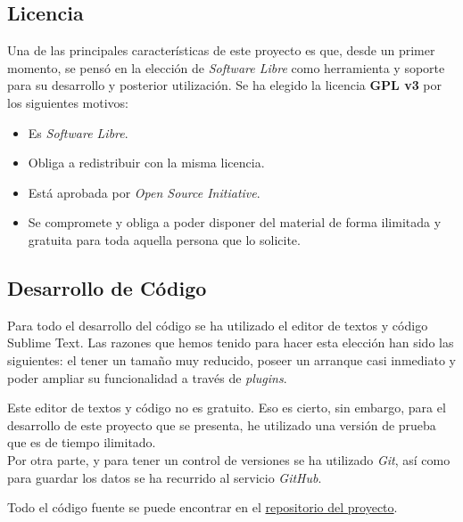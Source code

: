 \subsection{Licencia}
Una de las principales características de este proyecto es que, desde un primer momento, se pensó en la elección de \textit{Software Libre} como herramienta y soporte para su desarrollo y posterior utilización. Se ha elegido  la licencia \textbf{GPL v3} por los siguientes motivos:

\begin{itemize}
  \item Es \textit{Software Libre}.
  \item Obliga a redistribuir con la misma licencia.
  \item Está aprobada por \textit{Open Source Initiative}.
  \item Se compromete y obliga a poder disponer del material de forma ilimitada y gratuita para toda aquella persona que lo solicite.
\end{itemize}

\subsection{Desarrollo de Código}
Para todo el desarrollo del código se ha utilizado el editor de textos y código Sublime Text\cite{Sublime}.
Las razones que hemos tenido para hacer esta elección han sido las siguientes: el tener un tamaño muy reducido, poseer un arranque casi inmediato y poder ampliar su funcionalidad a través de \textit{plugins}.

Este editor de textos y código no es gratuito. Eso es cierto, sin embargo, para el desarrollo de este proyecto que se presenta, he utilizado una versión de prueba que es de tiempo ilimitado.\cite{BeneficiosSublime}\\

Por otra parte, y para tener un control de versiones se ha utilizado \textit{Git}, así como para guardar los datos se ha recurrido al servicio \textit{GitHub}\cite{GitHub}.

Todo el código fuente se puede encontrar en el \href{https://github.com/PabloTorrecillas/IndiWebClient}{repositorio del proyecto}.
